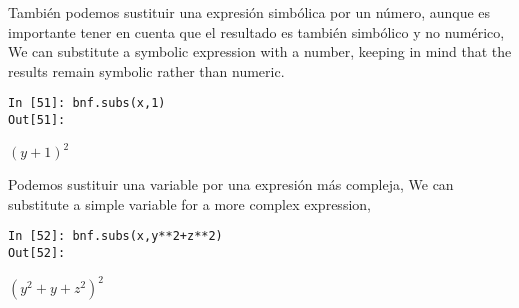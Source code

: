 \begin{paracol}{2}
También podemos sustituir una expresión simbólica por un número, aunque es importante tener en cuenta que el resultado es también simbólico y no numérico,
\switchcolumn
We can substitute a symbolic expression with a number, keeping in mind that the results remain symbolic rather than numeric.
\end{paracol}
\begin{center}
	\begin{minipage}{.25\textwidth}
		\begin{verbatim}
In [51]: bnf.subs(x,1)
Out[51]: 
		\end{verbatim}
		$(y+1)^2$
	\end{minipage}
\end{center}
\begin{paracol}{2}
Podemos sustituir una variable por una expresión más compleja,
\switchcolumn
We can substitute a simple variable for a more complex expression,
\end{paracol}
\begin{center}
	\begin{minipage}{.25\textwidth}
		\begin{verbatim}
In [52]: bnf.subs(x,y**2+z**2)
Out[52]:
\end{verbatim}
		$(y^2+y+z^2)^2$
	\end{minipage}
\end{center}

